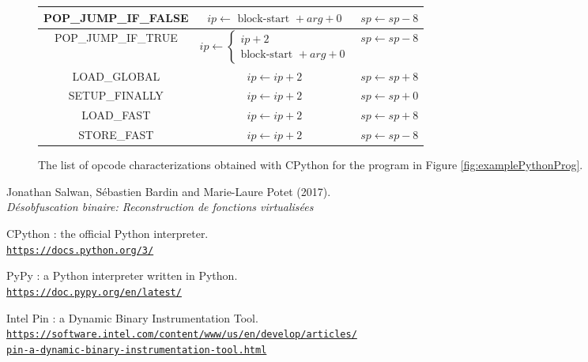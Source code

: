 \documentclass[english]{article}
\begin{document}
\begin{figure}[htp]
\begin{tabular}{|c|c|c|}
		\hline
		POP\_JUMP\_IF\_FALSE & $ip \leftarrow \textrm{ block-start } + arg + 0$ & $sp \leftarrow sp - 8$\\
		\hline
		POP\_JUMP\_IF\_TRUE & 
		$ip \leftarrow 
		\left\{ 
		\begin{array}{ll}
		ip + 2 \\ 
		\textrm{block-start } + arg + 0
		\end{array}
		\right.$ & $sp \leftarrow sp - 8$\\
		\hline
		LOAD\_GLOBAL & $ip \leftarrow ip + 2$ & $sp \leftarrow sp + 8$\\
		\hline
		SETUP\_FINALLY & $ip \leftarrow ip + 2$ & $sp \leftarrow sp + 0$\\
		\hline
		LOAD\_FAST & $ip \leftarrow ip + 2$ & $sp \leftarrow sp + 8$\\
		\hline
		STORE\_FAST & $ip \leftarrow ip + 2$ & $sp \leftarrow sp - 8$\\
		\hline
	\end{tabular}
	\caption{The list of opcode characterizations obtained with CPython for the program in Figure \ref{fig:examplePythonProg}.}
	\label{fig:semanticsTable}
\end{figure}



\begin{thebibliography}{9}
	Jonathan Salwan, Sébastien Bardin and Marie-Laure Potet (2017).
	\\\textit{Désobfuscation binaire: Reconstruction de fonctions virtualisées}
	
	CPython : the official Python interpreter.
	\href{https://docs.python.org/3/}{\\\texttt{https://docs.python.org/3/}}
	
	PyPy : a Python interpreter written in Python.
	\href{https://doc.pypy.org/en/latest/}{\\\texttt{https://doc.pypy.org/en/latest/}}
	
	Intel Pin : a Dynamic Binary Instrumentation Tool.
	\href{https://software.intel.com/content/www/us/en/develop/articles/pin-a-dynamic-binary-instrumentation-tool.html}{\\\texttt{https://software.intel.com/content/www/us/en/develop/articles/\\pin-a-dynamic-binary-instrumentation-tool.html}}
\end{thebibliography}
\end{document}
